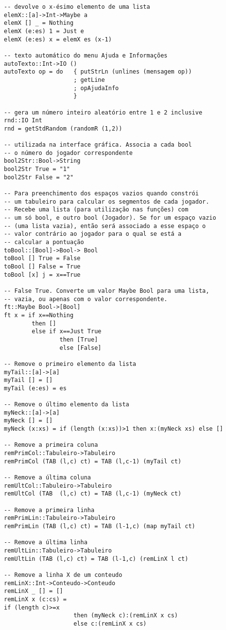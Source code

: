\documentclass[a4paper,titlepage]{scrreprt}
\begin{document}
\begin{verbatim}
-- devolve o x-ésimo elemento de uma lista
elemX::[a]->Int->Maybe a
elemX [] _ = Nothing
elemX (e:es) 1 = Just e
elemX (e:es) x = elemX es (x-1)

-- texto automático do menu Ajuda e Informações
autoTexto::Int->IO ()
autoTexto op = do	{ putStrLn (unlines (mensagem op))
					; getLine
					; opAjudaInfo
					}

-- gera um número inteiro aleatório entre 1 e 2 inclusive
rnd::IO Int
rnd = getStdRandom (randomR (1,2))

-- utilizada na interface gráfica. Associa a cada bool
-- o número do jogador correspondente
bool2Str::Bool->String
bool2Str True = "1"
bool2Str False = "2"

-- Para preenchimento dos espaços vazios quando constrói
-- um tabuleiro para calcular os segmentos de cada jogador.
-- Recebe uma lista (para utilização nas funções) com
-- um só bool, e outro bool (Jogador). Se for um espaço vazio
-- (uma lista vazia), então será associado a esse espaço o
-- valor contrário ao jogador para o qual se está a
-- calcular a pontuação
toBool::[Bool]->Bool-> Bool
toBool [] True = False
toBool [] False = True
toBool [x] j = x==True

-- False True. Converte um valor Maybe Bool para uma lista,
-- vazia, ou apenas com o valor correspondente.
ft::Maybe Bool->[Bool]
ft x = if x==Nothing 
		then []
		else if x==Just True
				then [True]
				else [False]

-- Remove o primeiro elemento da lista
myTail::[a]->[a]
myTail [] = []
myTail (e:es) = es

-- Remove o último elemento da lista
myNeck::[a]->[a]
myNeck [] = []
myNeck (x:xs) = if (length (x:xs))>1 then x:(myNeck xs) else []

-- Remove a primeira coluna
remPrimCol::Tabuleiro->Tabuleiro
remPrimCol (TAB (l,c) ct) = TAB (l,c-1) (myTail ct)

-- Remove a última coluna
remUltCol::Tabuleiro->Tabuleiro
remUltCol (TAB  (l,c) ct) = TAB (l,c-1) (myNeck ct)

-- Remove a primeira linha
remPrimLin::Tabuleiro->Tabuleiro
remPrimLin (TAB (l,c) ct) = TAB (l-1,c) (map myTail ct)

-- Remove a última linha
remUltLin::Tabuleiro->Tabuleiro
remUltLin (TAB (l,c) ct) = TAB (l-1,c) (remLinX l ct)

-- Remove a linha X de um conteudo
remLinX::Int->Conteudo->Conteudo
remLinX _ [] = []
remLinX x (c:cs) =
if (length c)>=x
					then (myNeck c):(remLinX x cs)
					else c:(remLinX x cs)


\end{verbatim}
\end{document}
